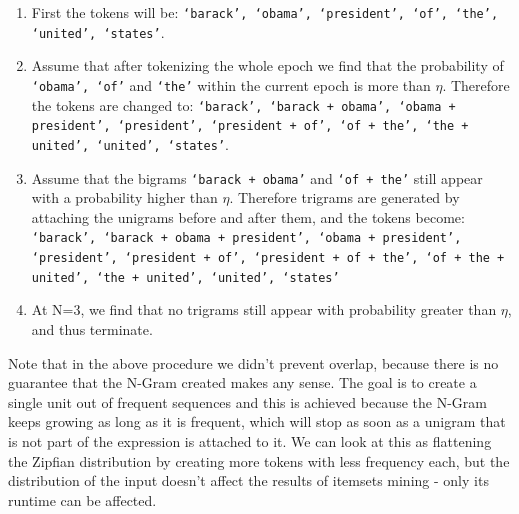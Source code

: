 \documentclass{sig-alternate}
\begin{document}
\begin{enumerate}
\item First the tokens will be: \texttt{`barack', `obama', `president', `of', `the', `united', `states'}. 
\item Assume that after tokenizing the whole epoch we find that the probability of \texttt{`obama', `of'} and \texttt{`the'} within the current epoch is more than $\eta$. Therefore the tokens are changed to: \texttt{`barack',  `barack + obama', `obama + president', `president', `president + \\of', `of + the', `the + united', `united', `states'}.
\item Assume that the bigrams  \texttt{`barack + obama'} and \texttt{`of + the'} still appear with a probability higher than %
$\eta$. Therefore trigrams are generated by attaching the unigrams before and after them, and the tokens become: \texttt{`barack',  `barack + obama + president', `obama + president', `president', `president + of', `president + of + the', `of + the + united', `the + \\united', `united', `states'}
\item At N=3, we find that no trigrams still appear with probability greater than $\eta$, and thus terminate.
\end{enumerate}

Note that in the above procedure we didn't prevent overlap, because there is no guarantee that the N-Gram created makes any sense. The goal is to create a single unit out of frequent sequences and this is achieved because the N-Gram keeps growing as long as it is frequent, which will stop as soon as a unigram that is not part of the expression is attached to it. We can look at this as flattening the Zipfian distribution by creating more tokens with less frequency each, but the distribution of the input doesn't affect the results of itemsets mining - only its runtime can be affected.
\end{document}
